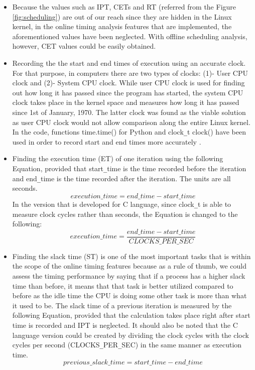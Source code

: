 \begin{itemize}
	\item Because the values such as IPT, CETs and RT (referred from the Figure \ref{fig:scheduling}) are out of our reach since they are hidden in the Linux kernel, in the online timing analysis features that are implemented, the aforementioned values have been neglected. With offline scheduling analysis, however, CET values could be easily obtained.
	\item Recording the the start and end times of execution using an accurate clock. For that purpose, in computers there are two types of clocks: (1)- User CPU clock and (2)- System CPU clock. While user CPU clock is used for finding out how long it has passed since the program has started, the system CPU clock takes place in the kernel space and measures how long it has passed since 1st of January, 1970. The latter clock was found as the viable solution as user CPU clock would not allow comparison along the entire Linux kernel. In the code, functions time.time() for Python and clock\texttt{\_}t clock() have been used in order to record start and end times more accurately \cite{cpuandusertimes} \cite{cpuandusertimes2}.
	\item Finding the execution time (ET) of one iteration using the following Equation, provided that start\texttt{\_}time is the time recorded before the iteration and end\texttt{\_}time is the time recorded after the iteration. The units are all seconds.
	\begin{equation}
	execution\texttt{\_}time=end\texttt{\_}time - start\texttt{\_}time
	\end{equation}
	In the version that is developed for C language, since clock\texttt{\_}t is able to measure clock cycles rather than seconds, the Equation is changed to the following:
	\begin{equation}
	execution\texttt{\_}time=\frac{end\texttt{\_}time - start\texttt{\_}time} {CLOCKS\texttt{\_}PER\texttt{\_}SEC}
	\end{equation}
	
	\item Finding the slack time (ST) is one of the most important tasks that is within the scope of the online timing features because as a rule of thumb, we could assess the timing performance by saying that if a process has a higher slack time than before, it means that that task is better utilized compared to before as the idle time the CPU is doing some other task is more than what it used to be. The slack time of a previous iteration is measured by the following Equation, provided that the calculation takes place right after start time is recorded and IPT is neglected. It should also be noted that the C language version could be created by dividing the clock cycles with the clock cycles per second (CLOCKS\texttt{\_}PER\texttt{\_}SEC) in the same manner as execution time.
	\begin{equation}
	previous\texttt{\_}slack\texttt{\_}time=start\texttt{\_}time - end\texttt{\_}time
	\end{equation}
	

\end{itemize}
